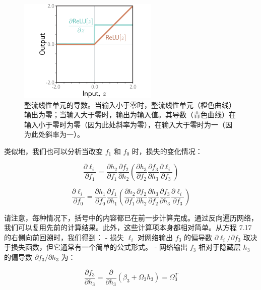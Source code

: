 \begin{figure}[ht!]
\centering
\includegraphics[width=0.7\linewidth]{png/chapter7/Train2ReLUDeriv.png}
\caption{整流线性单元的导数。当输入小于零时，整流线性单元（橙色曲线）输出为零；当输入大于零时，输出为输入值。其导数（青色曲线）在输入小于零时为零（因为此处斜率为零），在输入大于零时为一（因为此处斜率为一）。}
\end{figure}

类似地，我们也可以分析当改变 \(f_1\) 和 \(f_0\) 时，损失的变化情况：

\begin{equation}
\frac{\partial \ell_i}{\partial f_1} = \frac{\partial h_2}{\partial f_1}  \frac{\partial f_2}{\partial h_2}\left( \frac{\partial h_3}{\partial f_2} \frac{\partial f_3}{\partial h_3} \frac{\partial \ell_i}{\partial f_3} \right) 
\end{equation}


\begin{equation}
\frac{\partial \ell_i}{\partial f_0} = \frac{\partial h_1}{\partial f_0} \frac{\partial f_1}{\partial h_1} \left( \frac{\partial h_2}{\partial f_1} \frac{\partial f_2}{\partial h_2} \frac{\partial h_3}{\partial f_2} \frac{\partial f_3}{\partial h_3} \frac{\partial \ell_i}{\partial f_3} \right) 
\end{equation}

请注意，每种情况下，括号中的内容都已在前一步计算完成。通过反向遍历网络，我们可以复用先前的计算结果。此外，这些计算项本身都相对简单。从方程 7.17 的右侧向前回溯时，我们得到：
- 损失 \(\ell_i\) 对网络输出 \(f_3\) 的偏导数 \(\partial \ell_i/\partial f_3\) 取决于损失函数，但它通常有一个简单的公式形式。
- 网络输出 \(f_3\) 相对于隐藏层 \(h_3\) 的偏导数 \(\partial f_3/\partial h_3\) 为：


\begin{equation}
\frac{\partial f_3}{\partial h_3} = \frac{\partial}{\partial h_3} (\beta_3 + \Omega_3 h_3) = \Omega_3^T  
\end{equation}

